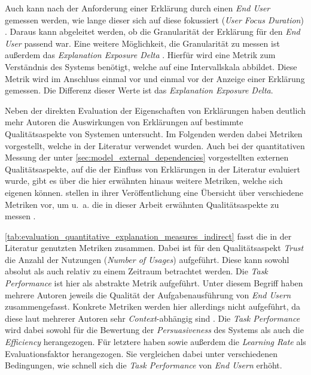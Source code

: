 Auch kann nach der Anforderung einer Erklärung durch einen \textit{End User} gemessen werden, wie lange dieser sich auf diese fokussiert (\textit{User Focus Duration}) \cite{balog_measuring_2020}. Daraus kann abgeleitet werden, ob die Granularität der Erklärung für den \textit{End User} passend war. Eine weitere Möglichkeit, die Granularität zu messen ist außerdem das \textit{Explanation Exposure Delta} \cite{nunes_systematic_2017}. Hierfür wird eine Metrik zum Verständnis des Systems benötigt, welche auf eine Intervallskala abbildet. Diese Metrik wird im Anschluss einmal vor und einmal vor der Anzeige einer Erklärung gemessen. Die Differenz dieser Werte ist das \textit{Explanation Exposure Delta}.

Neben der direkten Evaluation der Eigenschaften von Erklärungen haben deutlich mehr Autoren die Auswirkungen von Erklärungen auf bestimmte Qualitätsaspekte von Systemen untersucht. Im Folgenden werden dabei Metriken vorgestellt, welche in der Literatur verwendet wurden. Auch bei der quantitativen Messung der unter \autoref{sec:model_external_dependencies} vorgestellten externen Qualitätsaspekte, auf die der Einfluss von Erklärungen in der Literatur evaluiert wurde, gibt es über die hier erwähnten hinaus weitere Metriken, welche sich eigenen können. \citeauthor{carvalho2017quality} stellen in ihrer Veröffentlichung eine Übersicht über verschiedene Metriken vor, um u.~a. die in dieser Arbeit erwähnten Qualitätsaspekte zu messen \cite{carvalho2017quality}.

\autoref{tab:evaluation_quantitative_explanation_measures_indirect} fasst die in der Literatur genutzten Metriken zusammen. Dabei ist für den Qualitätsaspekt \textit{Trust} die Anzahl der Nutzungen (\textit{Number of Usages}) aufgeführt. Diese kann sowohl absolut als auch relativ zu einem Zeitraum betrachtet werden. Die \textit{Task Performance} ist hier als abstrakte Metrik aufgeführt. Unter diesem Begriff haben mehrere Autoren jeweils die Qualität der Aufgabenausführung von \textit{End Usern} zusammengefasst. Konkrete Metriken werden hier allerdings nicht aufgeführt, da diese laut mehrerer Autoren sehr \textit{Context}-abhängig sind \citeauthor{tintarev2007survey, gunning2019darpa}. Die \textit{Task Performance} wird dabei sowohl für die Bewertung der \textit{Persuasiveness} des Systems als auch die \textit{Efficiency} herangezogen. Für letztere haben \citeauthor{tintarev_designing_nodate} sowie \citeauthor{gunning2019darpa} außerdem die \textit{Learning Rate} als Evaluationsfaktor herangezogen. Sie vergleichen dabei unter verschiedenen Bedingungen, wie schnell sich die \textit{Task Performance} von \textit{End Usern} erhöht.

